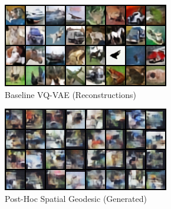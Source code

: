 \documentclass{article}
\begin{document}
\begin{figure}[!p]
    \centering
    \begin{subfigure}[b]{0.32\textwidth}
        \includegraphics[width=\linewidth]{images/cifar10_baselineVQ.png}
        \caption{Baseline VQ-VAE (Reconstructions)}
        \label{fig:cifar_baseline}
    \end{subfigure}
    \hfill
    \begin{subfigure}[b]{0.32\textwidth}
        \includegraphics[width=\linewidth]{images/cifar10_spatial_geodesic_generated_samples.png}
        \caption{Post-Hoc Spatial Geodesic (Generated)}
        \label{fig:cifar_spatial}
    \end{subfigure}
    \hfill
    \begin{subfigure}[b]{0.32\textwidth}

\end{subfigure}
\end{figure}
\end{document}
